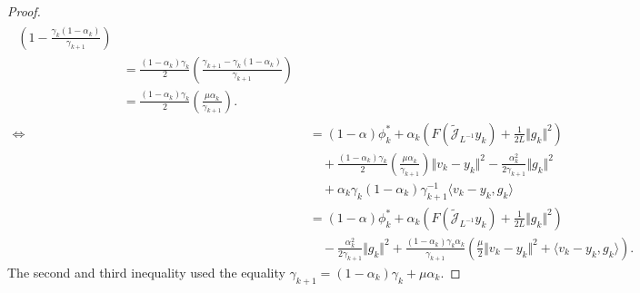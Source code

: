 \documentclass[12pt]{article}
\begin{document}
\begin{proof}
\begin{align*}
{\begin{aligned}
                    \left(
                        1 - \frac{\gamma_k (1 - \alpha_k)}{\gamma_{k + 1}}
                    \right)
                    \\
                    &= 
                    \frac{(1 - \alpha_k)\gamma_k}{2}
                    \left(
                        \frac{\gamma_{k + 1} - \gamma_k(1 - \alpha_k)}{\gamma_{k + 1}}
                    \right)
                    \\
                    &= 
                    \frac{(1 - \alpha_k)\gamma_k}{2}
                    \left(
                        \frac{\mu \alpha_k}{\gamma_{k + 1}}
                    \right). 
                \end{aligned}
            }
            \\
            \iff 
            &= 
                (1 - \alpha)\phi_k^* + 
                \alpha_k
                \left(
                    F\left(\widetilde{\mathcal J}_{L^{-1}} y_k\right) + 
                    \frac{1}{2L}\Vert g_k\Vert^2
                \right)
                \\
                &\quad 
                + 
                \frac{(1 - \alpha_k)\gamma_k}{2}
                \left(
                    \frac{\mu \alpha_k}{\gamma_{k + 1}}
                \right)
                \Vert v_k - y_k\Vert^2
                - \frac{\alpha_k^2}{2\gamma_{k + 1}}\Vert g_k\Vert^2
                \\
                & \quad 
                + \alpha_k\gamma_k(1 - \alpha_k)\gamma_{k + 1}^{-1}\langle v_k -y_k, g_k\rangle
            \\
            &= 
                (1 - \alpha)\phi_k^* 
                + 
                \alpha_k
                \left(
                    F\left(\widetilde{\mathcal J}_{L^{-1}} y_k\right) + 
                    \frac{1}{2L}\Vert g_k\Vert^2
                \right)
                \\
                &\quad 
                - 
                \frac{\alpha_k^2}{2\gamma_{k + 1}}\Vert g_k\Vert^2
                + 
                \frac{(1 - \alpha_k)\gamma_k\alpha_k}{\gamma_{k + 1}}
                \left(
                    \frac{\mu}{2}\Vert v_k - y_k\Vert^2
                    + \langle v_k - y_k, g_k\rangle
                \right). 
        \end{align*}
        The second and third inequality used the equality $\gamma_{k + 1} = (1 - \alpha_k)\gamma_k + \mu \alpha_k$. 
    \end{proof}
    
\end{document}
